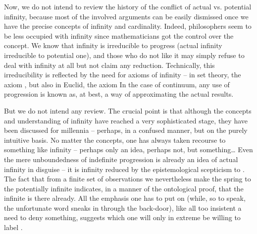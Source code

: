 \pa Now, we do not intend to review the history of the conflict of actual vs.
potential infinity, because most of the involved arguments can be easily
dismissed once we have the precise concepts of infinity and
cardinality. Indeed, philosophers seem to be less occupied with infinity since
mathematicians got the control over the concept. We know that infinity is
irreducible to progress (actual infinity irreducible to potential one), and
those who do not like it may simply refuse to deal with infinity at all but not
claim any reduction.  Technically, this irreducibility is reflected
by the need for axioms of infinity -- in set theory, the axiom , but also in Euclid, the axiom 
In the case of continuum, any use of progression is known as, at best, a way
of approximating the actual results. 

But we do not intend any review. The crucial point is that although the
concepts and understanding of infinity have reached a very sophisticated stage,
they have been discussed for millennia -- perhaps, in a confused manner, but on
the purely intuitive basis.  No matter the concepts, one has always taken recourse
to something like infinity -- perhaps only an idea, perhaps not, but
something\ldots
Even the mere unboundedness of indefinite progression is already an idea of actual
infinity in disguise -- it is infinity reduced by the epistemological scepticism
to .
The fact that from a finite set of observations we nevertheless make the
spring to the potentially infinite indicates, in a manner of the ontological
proof, that the infinite is there already. All the emphasis one has to put on
 (while, so to speak, the unfortunate word
 sneaks in through the back-door), like all too insistent a 
need to deny something, suggests  which one will only in extreme be
willing to label . 

